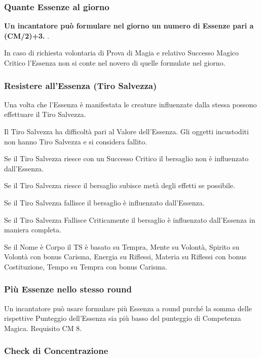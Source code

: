 \documentclass[a4paper,twoside,openany]{book}
\begin{document}
\begin{multicols}{2}
\subsubsection{Quante Essenze al giorno}


\textbf{Un incantatore può formulare nel giorno un numero di Essenze pari a (CM/2)+3.} .

In caso di richiesta volontaria di Prova di Magia e relativo Successo Magico Critico l'Essenza  non si conte nel novero di quelle formulate nel giorno.


\subsubsection{Resistere all'Essenza (Tiro Salvezza)}

\label{resistere-allessenza-tiro-salvezza}

Una volta che l'Essenza è manifestata le creature influenzate dalla stessa possono effettuare il Tiro Salvezza.

Il Tiro Salvezza ha difficoltà pari al Valore dell'Essenza. Gli oggetti incustoditi non hanno Tiro Salvezza e si considera fallito.

Se il Tiro Salvezza riesce con un Successo Critico il bersaglio non è influenzato dall'Essenza.

Se il Tiro Salvezza riesce il bersaglio subisce metà degli effetti se possibile.

Se il Tiro Salvezza fallisce il bersaglio è influenzato dall'Essenza.

Se il Tiro Salvezza Fallisce Criticamente il bersaglio è influenzato dall'Essenza in maniera completa.

Se il Nome è Corpo il TS è basato su Tempra, Mente su Volontà, Spirito su Volontà con bonus Carisma, Energia su Riflessi, Materia su Riflessi con bonus Costituzione, Tempo su Tempra con bonus Carisma.


\subsubsection{Più Essenze nello stesso round}

Un incantatore può usare formulare più Essenza a round purché la somma delle rispettive Punteggio dell'Essenza sia più basso del punteggio di Competenza Magica. Requisito CM 8.


\subsubsection{Check di Concentrazione}


\end{multicols}
\end{document}
